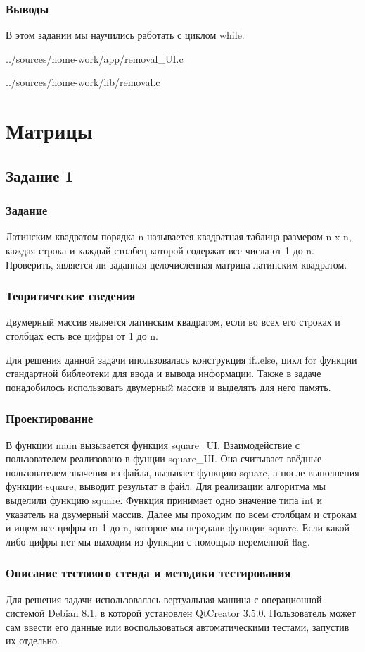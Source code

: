 \documentclass[12pt,a4paper]{report}
\begin{document}
\subsection{Выводы}
В этом задании мы научились работать с циклом while.

{../sources/home-work/app/removal_UI.c}


{../sources/home-work/lib/removal.c}
\chapter{Матрицы}
\section{Задание 1}
\subsection{Задание}
Латинским квадратом порядка n называется квадратная таблица размером n x n, каждая строка и каждый столбец которой содержат все числа от 1 до n. Проверить, является ли заданная целочисленная матрица латинским квадратом.
\subsection{Теоритические сведения}
Двумерный массив является латинским квадратом, если во всех его строках и столбцах есть все цифры от 1 до n.

Для решения данной задачи ипользовалась конструкция if..else, цикл for функции стандартной библеотеки для ввода и вывода информации. Также в задаче понадобилось использовать двумерный массив и выделять для него память.
\subsection{Проектирование}
В функции main вызывается функция square\_UI. Взаимодействие с пользователем реализовано в фунции square\_UI. Она считывает ввёдные пользователем значения из файла, вызывает функцию square, а после выполнения функции square, выводит результат в файл. Для реализации алгоритма мы выделили функцию square. Функция принимает одно значение типа int и указатель на двумерный массив. Далее мы проходим по всем столбцам и строкам и ищем все цифры от 1 до n, которое мы передали функции square. Если какой-либо цифры нет мы выходим из функции с помощью переменной flag. 
\subsection{Описание тестового стенда и методики тестирования}
Для решения задачи использовалась вертуальная машина с операционной системой Debian 8.1, в которой установлен QtCreator 3.5.0. 
Пользователь может сам ввести его данные или воспользоваться автоматическими тестами, запустив их отдельно.
\end{document}
